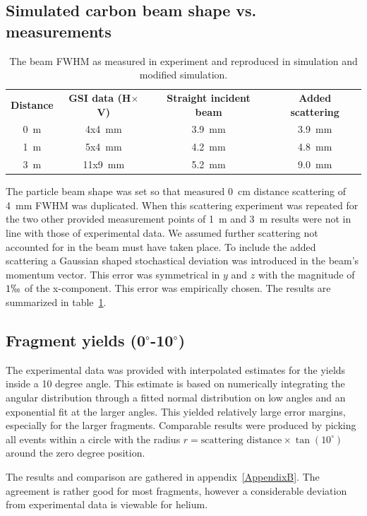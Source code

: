 \subsection{Simulated carbon beam shape vs. measurements\label{beamShapeAnalysis}}
\begin{center}
\begin{table}[!h]
\begin{tabular}{cccc} %
\textbf{Distance} & \textbf{GSI data (H$\times$V)} & \textbf{Straight incident beam} & \textbf{Added scattering} \\
0~m &4x4~mm& 3.9~mm & 3.9~mm\\
1~m &5x4~mm & 4.2~mm & 4.8~mm\\
3~m &11x9~mm& 5.2~mm & 9.0~mm\\
\end{tabular} 
\caption{\label{fig:beamFWHMtable} The beam FWHM as measured in experiment and reproduced in simulation and modified simulation.}
\end{table}
\end{center}
The particle beam shape was set so that measured 0~cm distance scattering of 4~mm FWHM was duplicated. When this scattering experiment was repeated for the two other provided measurement points of 1~m and 3~m results were not in line with those of experimental data. We assumed further scattering not accounted for in the beam must have taken place. To include the added scattering a Gaussian shaped stochastical deviation was introduced in the beam's momentum vector. This error was symmetrical in $y$ and $z$ with the magnitude of $1\permil$ of the x-component. This error was empirically chosen. The results are summarized in table~\ref{fig:beamFWHMtable}.


\subsection{Fragment yields (0$^\circ$-10$^\circ$)\label{yieldAnalysis}}
The experimental data was provided with interpolated estimates for the yields inside a 10 degree angle. This estimate is based on numerically integrating the angular distribution through a fitted normal distribution on low angles and an exponential fit at the larger angles. This yielded relatively large error margins, especially for the larger fragments. Comparable results were produced by picking all events within a circle with the radius $r = \text{scattering distance} \times \tan(10^{\circ})$ around the zero degree position.

The results and comparison are gathered in appendix~\ref{AppendixB}. The agreement is rather good for most fragments, however a considerable deviation from experimental data is viewable for helium.

